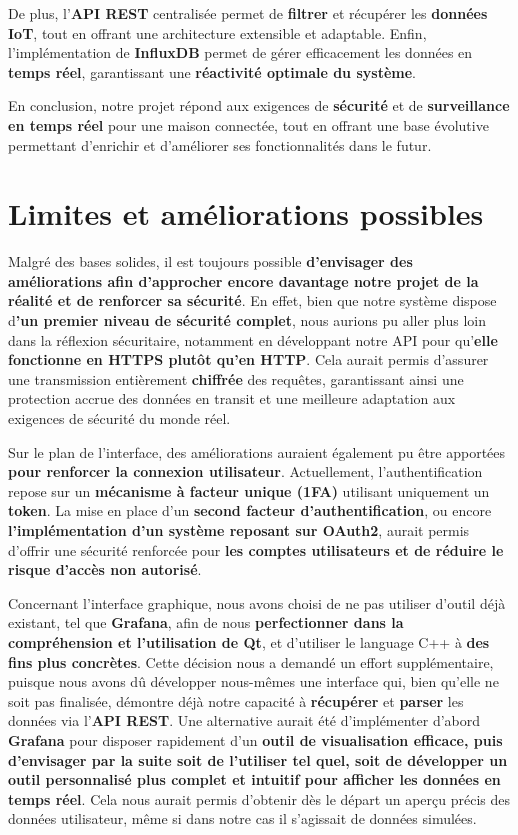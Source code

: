 \documentclass[10pt, a4paper]{report}
\begin{document}
	De plus, l’\textbf{API REST} centralisée permet de \textbf{filtrer} et récupérer les \textbf{données IoT}, tout en offrant une architecture extensible et adaptable. Enfin, l’implémentation de \textbf{InfluxDB} permet de gérer efficacement les données en \textbf{temps réel}, garantissant une \textbf{réactivité optimale du système}.
	
	En conclusion, notre projet répond aux exigences de \textbf{sécurité} et de \textbf{surveillance en temps réel} pour une maison connectée, tout en offrant une base évolutive permettant d’enrichir et d’améliorer ses fonctionnalités dans le futur.
	
	\section{Limites et améliorations possibles}
	
	Malgré des bases solides, il est toujours possible \textbf{d’envisager des améliorations afin d’approcher encore davantage notre projet de la réalité et de renforcer sa sécurité}. En effet, bien que notre système dispose d\textbf{’un premier niveau de sécurité complet}, nous aurions pu aller plus loin dans la réflexion sécuritaire, notamment en développant notre API pour qu’\textbf{elle fonctionne en HTTPS plutôt qu’en HTTP}. Cela aurait permis d’assurer une transmission entièrement \textbf{chiffrée} des requêtes, garantissant ainsi une protection accrue des données en transit et une meilleure adaptation aux exigences de sécurité du monde réel.
	
	Sur le plan de l’interface, des améliorations auraient également pu être apportées \textbf{pour renforcer la connexion utilisateur}. Actuellement, l’authentification repose sur un \textbf{mécanisme à facteur unique (1FA)} utilisant uniquement un \textbf{token}. La mise en place d’un\textbf{ second facteur d’authentification}, ou encore \textbf{l’implémentation d’un système reposant sur OAuth2}, aurait permis d’offrir une sécurité renforcée pour \textbf{les comptes utilisateurs et de réduire le risque d’accès non autorisé}.
	
	Concernant l’interface graphique, nous avons choisi de ne pas utiliser d’outil déjà existant, tel que \textbf{Grafana}, afin de nous \textbf{perfectionner dans la compréhension et l’utilisation de Qt}, et d'utiliser le language C++ à \textbf{des fins plus concrètes}. Cette décision nous a demandé un effort supplémentaire, puisque nous avons dû développer nous-mêmes une interface qui, bien qu’elle ne soit pas finalisée, démontre déjà notre capacité à \textbf{récupérer} et \textbf{parser} les données via l’\textbf{API REST}. Une alternative aurait été d’implémenter d’abord \textbf{Grafana} pour disposer rapidement d’un \textbf{outil de visualisation efficace, puis d’envisager par la suite soit de l’utiliser tel quel, soit de développer un outil personnalisé plus complet et intuitif pour afficher les données en temps réel}. Cela nous aurait permis d’obtenir dès le départ un aperçu précis des données utilisateur, même si dans notre cas il s’agissait de données simulées.
	
\end{document}

